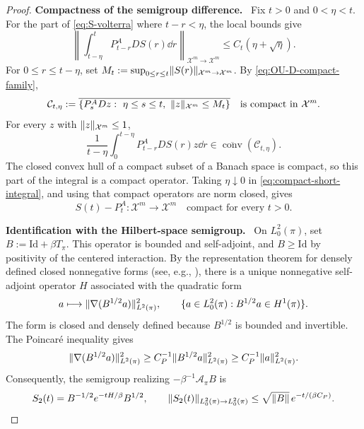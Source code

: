 \documentclass[11pt,reqno]{amsart}
\numberwithin{equation}{section}
\theoremstyle{plain}
\theoremstyle{remark}
\DeclarePairedDelimiter{\norm}{\lVert}{\rVert}
\newcommand{\parheading}[1]{\par\medskip\noindent\textbf{#1}\ }
\newcommand{\Xspace}{\mathcal X}
\newcommand{\Aop}{\mathcal A}
\newcommand{\Id}{\mathrm{Id}}
\begin{document}
\begin{proof}
\parheading{Compactness of the semigroup difference.}
Fix $t>0$ and $0<\eta<t$. For the part of \eqref{eq:S-volterra} where $t-r<\eta$, the local bounds give
\begin{equation}\label{eq:compact-short-integral}
 \left\|\int_{t-\eta}^tP_{t-r}^ADS(r)\dd r\right\|_{\Xspace^m\to\Xspace^m}
 \le C_t(\eta+\sqrt\eta).
\end{equation}
For $0\le r\le t-\eta$, set $M_t:=\sup_{0\le r\le t}\norm{S(r)}_{\Xspace^m\to\Xspace^m}$. By \eqref{eq:OU-D-compact-family},
\begin{equation}\label{eq:compact-integral-image-set}
 \mathcal C_{t,\eta}:=
 \overline{\{P_s^ADz:\ \eta\le s\le t,\ \norm z_{\Xspace^m}\le M_t\}}
 \quad\text{is compact in }\Xspace^m.
\end{equation}
For every $z$ with $\norm z_{\Xspace^m}\le1$,
\begin{equation}\label{eq:compact-integral-hull}
 \frac1{t-\eta}\int_0^{t-\eta}P_{t-r}^ADS(r)z\dd r
 \in\overline{\operatorname{conv}}(\mathcal C_{t,\eta}).
\end{equation}
The closed convex hull of a compact subset of a Banach space is compact, so this part of the integral is a compact operator. Taking $\eta\downarrow0$ in \eqref{eq:compact-short-integral}, and using that compact operators are norm closed, gives
\begin{equation}\label{eq:compact-semigroup-difference}
 S(t)-P_t^A:\Xspace^m\longrightarrow\Xspace^m
 \quad\text{compact for every }t>0.
\end{equation}

\parheading{Identification with the Hilbert-space semigroup.}
On $L^2_0(\pi)$, set $B:=\Id+\beta T_\pi$. This operator is bounded and self-adjoint, and $B\ge\Id$ by positivity of the centered interaction. By the representation theorem for densely defined closed nonnegative forms (see, e.g., \cite[Chapter VI, Section 2]{Kato}), there is a unique nonnegative self-adjoint operator $H$ associated with the quadratic form
\begin{equation}\label{eq:Hilbert-form-domain}
 a\longmapsto\norm{\nabla(B^{1/2}a)}_{L^2(\pi)}^2,
 \qquad
 \{a\in L^2_0(\pi):B^{1/2}a\in H^1(\pi)\}.
\end{equation}
The form is closed and densely defined because $B^{1/2}$ is bounded and invertible. The Poincar\'e inequality gives
\begin{equation}\label{eq:Hilbert-form-gap}
 \norm{\nabla(B^{1/2}a)}_{L^2(\pi)}^2
 \ge C_P^{-1}\norm{B^{1/2}a}_{L^2(\pi)}^2
 \ge C_P^{-1}\norm a_{L^2(\pi)}^2.
\end{equation}
Consequently, the semigroup realizing $-\beta^{-1}\Aop_\pi B$ is
\begin{equation}\label{eq:L2-semigroup}
 S_2(t)=B^{-1/2}e^{-tH/\beta}B^{1/2},\qquad
 \norm{S_2(t)}_{L^2_0(\pi)\to L^2_0(\pi)}
       \le\sqrt{\norm B}\,e^{-t/(\beta C_P)}.
\end{equation}


\end{proof}
\end{document}
